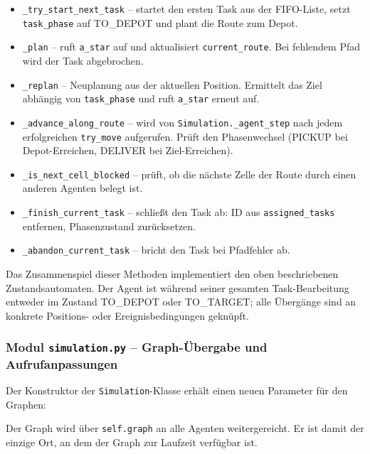 \begin{itemize}
    \item \texttt{\_try\_start\_next\_task} -- startet den ersten Task aus der FIFO-Liste, setzt \texttt{task\_phase} auf TO\_DEPOT und plant die Route zum Depot.
    \item \texttt{\_plan} -- ruft \texttt{a\_star} auf und aktualisiert \texttt{current\_route}. Bei fehlendem Pfad wird der Task abgebrochen.
    \item \texttt{\_replan} -- Neuplanung aus der aktuellen Position. Ermittelt das Ziel abhängig von \texttt{task\_phase} und ruft \texttt{a\_star} erneut auf.
    \item \texttt{\_advance\_along\_route} -- wird von \texttt{Simulation.\_agent\_step} nach jedem erfolgreichen \texttt{try\_move} aufgerufen. Prüft den Phasenwechsel (PICKUP bei Depot-Erreichen, DELIVER bei Ziel-Erreichen).
    \item \texttt{\_is\_next\_cell\_blocked} -- prüft, ob die nächste Zelle der Route durch einen anderen Agenten belegt ist.
    \item \texttt{\_finish\_current\_task} -- schließt den Task ab: ID aus \texttt{assigned\_tasks} entfernen, Phasenzustand zurücksetzen.
    \item \texttt{\_abandon\_current\_task} -- bricht den Task bei Pfadfehler ab.
\end{itemize}

Das Zusammenspiel dieser Methoden implementiert den oben beschriebenen Zustandsautomaten. Der Agent ist während seiner gesamten Task-Bearbeitung entweder im Zustand TO\_DEPOT oder TO\_TARGET; alle Übergänge sind an konkrete Positions- oder Ereignisbedingungen geknüpft.


\subsubsection{Modul \texttt{simulation.py} – Graph-Übergabe und Aufrufanpassungen}

Der Konstruktor der \texttt{Simulation}-Klasse erhält einen neuen Parameter für den Graphen:



Der Graph wird über \texttt{self.graph} an alle Agenten weitergereicht. Er ist damit der einzige Ort, an dem der Graph zur Laufzeit verfügbar ist.

